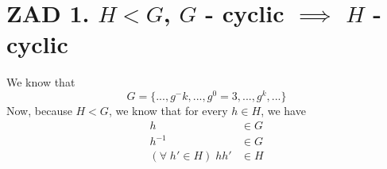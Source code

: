 \documentclass{article}
\begin{document}
    \section*{ZAD 1. $H<G$, $G$ - cyclic $\implies$ $H$ - cyclic}

    We know that
    $$G=\{..., g^-k,...,g^0=3,...,g^k,...\}$$
    Now, because $H<G$, we know that for every $h\in H$, we have
    \begin{align*}
        h&\in G\\
        h^{-1}&\in G\\
        (\forall\;h'\in H)\;hh'&\in H
    \end{align*}

    
\end{document}
